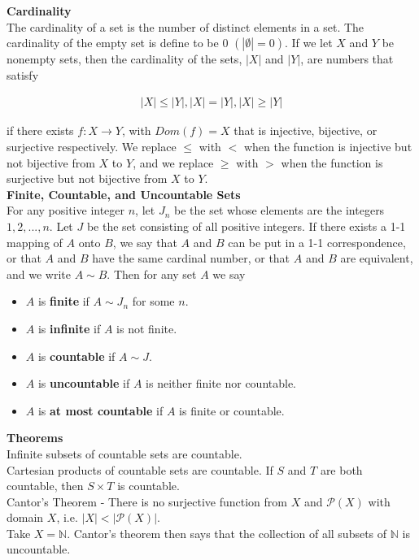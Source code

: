 \documentclass{article}
\numberwithin{theorem}{subsection}
\numberwithin{theorem}{subsubsection}
\theoremstyle{definition}
\numberwithin{definition}{subsection}
\numberwithin{definition}{subsubsection}
\begin{document}
\noindent \textbf{Cardinality} \\
\indent The cardinality of a set is the number of distinct elements in a set. The cardinality of the empty set is define to be 0 $(|\emptyset| = 0)$. If we let $X$ and $Y$ be nonempty sets, then the cardinality of the sets, $|X|$ and $|Y|$, are numbers that satisfy

\begin{gather*}
    |X| \leq |Y|, |X| = |Y|, |X| \geq |Y|
\end{gather*}

\noindent if there exists $f: X \rightarrow Y$, with $Dom(f) = X$ that is injective, bijective, or surjective respectively. We replace $\leq$ with $<$ when the function is injective but not bijective from $X$ to $Y$, and we replace $\geq$ with $>$ when the function is surjective but not bijective from $X$ to $Y$. \\

\noindent \textbf{Finite, Countable, and Uncountable Sets} \\
\indent For any positive integer $n$, let $J_{n}$ be the set whose elements are the integers $1,2,...,n$. Let $J$ be the set consisting of all positive integers. If there exists a 1-1 mapping of $A$ onto $B$, we say that $A$ and $B$ can be put in a 1-1 correspondence, or that $A$ and $B$ have the same cardinal number, or that $A$ and $B$ are equivalent, and we write $A \sim B$. Then for any set $A$ we say
\begin{itemize}
    \item $A$ is \textbf{finite} if $A \sim J_{n}$ for some $n$.
    \item $A$ is \textbf{infinite} if $A$ is not finite.
    \item $A$ is \textbf{countable} if $A \sim J$.
    \item $A$ is \textbf{uncountable} if $A$ is neither finite nor countable.
    \item $A$ is \textbf{at most countable} if $A$ is finite or countable.
\end{itemize}


\noindent \textbf{Theorems} \\
\indent Infinite subsets of countable sets are countable. \\
\indent Cartesian products of countable sets are countable. If $S$ and $T$ are both countable, then $S \times T$ is countable.\\
\indent Cantor's Theorem - There is no surjective function from $X$ and $\mathcal{P}(X)$ with domain $X$, i.e. $|X| < |\mathcal{P}(X)|$.  \\
\indent Take $X = \mathbb{N}$. Cantor's theorem then says that the collection of all subsets of $\mathbb{N}$ is uncountable. 
\end{document}
